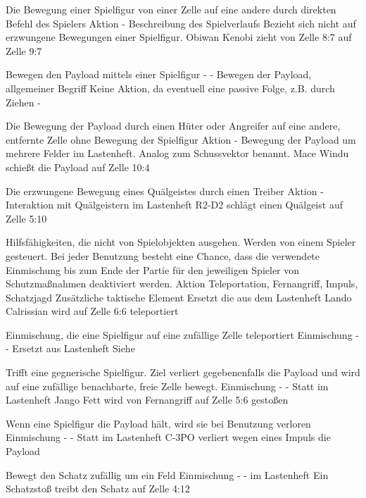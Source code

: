 {Die Bewegung einer Spielfigur von einer Zelle auf eine andere durch direkten Befehl des Spielers}
{Aktion}
{-}
{Beschreibung des Spielverlaufs}
{Bezieht sich nicht auf erzwungene Bewegungen einer Spielfigur.}
{Obiwan Kenobi zieht von Zelle 8:7 auf Zelle 9:7}

{Bewegen den Payload mittels einer Spielfigur}
{-}
{-}
{Bewegen der Payload, allgemeiner Begriff}
{Keine Aktion, da eventuell eine passive Folge, z.B. durch Ziehen}
{-}

{Die Bewegung der Payload durch einen Hüter oder Angreifer auf eine andere, entfernte Zelle ohne Bewegung der Spielfigur}
{Aktion}
{-}
{Bewegung der Payload um mehrere Felder}
{\glqqWerfen\grqq im Lastenheft. Analog zum Schussvektor benannt.}
{Mace Windu schießt die Payload auf Zelle 10:4}

{Die erzwungene Bewegung eines Quälgeistes durch einen Treiber}
{Aktion}
{-}
{Interaktion mit Quälgeistern}
{\glqqKloppen\grqq im Lastenheft}
{R2-D2 schlägt einen Quälgeist auf Zelle 5:10}

{Hilfsfähigkeiten, die nicht von Spielobjekten ausgehen. Werden von einem Spieler gesteuert. Bei jeder Benutzung besteht eine Chance, dass die verwendete Einmischung bis zum Ende der Partie für den jeweiligen Spieler von Schutzmaßnahmen deaktiviert werden.}
{Aktion}
{Teleportation, Fernangriff, Impuls, Schatzjagd}
{Zusätzliche taktische Element}
{Ersetzt die \glqqFans\grqq aus dem Lastenheft}
{Lando Calrissian wird auf Zelle 6:6 teleportiert}

{Einmischung, die eine Spielfigur auf eine zufällige Zelle teleportiert}
{Einmischung}
{-}
{-}
{Ersetzt \glqqElfen\grqq aus Lastenheft}
{Siehe \glqqEinmischungen\grqq}

{Trifft eine gegnerische Spielfigur. Ziel verliert gegebenenfalls die Payload und wird auf eine zufällige benachbarte, freie Zelle bewegt.}
{Einmischung}
{-}
{-}
{Statt \glqqKobolde\grqq im Lastenheft}
{Jango Fett wird von Fernangriff auf Zelle 5:6 gestoßen}

{Wenn eine Spielfigur die Payload hält, wird sie bei Benutzung verloren}
{Einmischung}
{-}
{-}
{Statt \glqqTrolle\grqq im Lastenheft}
{C-3PO verliert wegen eines Impuls die Payload}

{Bewegt den Schatz zufällig um ein Feld}
{Einmischung}
{-}
{-}
{\glqqSchnatzschnappen\grqq im Lastenheft}
{Ein Schatzstoß treibt den Schatz auf Zelle 4:12}

